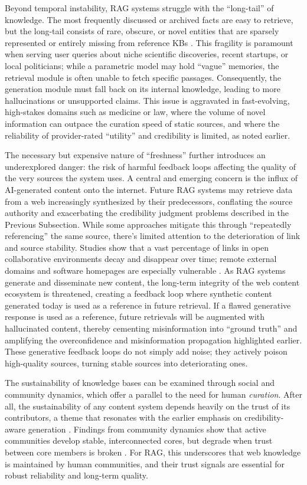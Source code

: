 \documentclass[11pt]{article}
\begin{document}
Beyond temporal instability, RAG systems struggle with the ``long-tail'' of knowledge. The most frequently discussed or archived facts are easy to retrieve, but the long-tail consists of rare, obscure, or novel entities that are sparsely represented or entirely missing from reference KBs \cite{ref244}. This fragility is paramount when serving user queries about niche scientific discoveries, recent startups, or local politicians; while a parametric model may hold ``vague'' memories, the retrieval module is often unable to fetch specific passages. Consequently, the generation module must fall back on its internal knowledge, leading to more hallucinations or unsupported claims. This issue is aggravated in fast-evolving, high-stakes domains such as medicine or law, where the volume of novel information can outpace the curation speed of static sources, and where the reliability of provider-rated ``utility'' and credibility is limited, as noted earlier.

The necessary but expensive nature of ``freshness'' further introduces an underexplored danger: the risk of harmful feedback loops affecting the quality of the very sources the system uses. A central and emerging concern is the influx of AI-generated content onto the internet. Future RAG systems may retrieve data from a web increasingly synthesized by their predecessors, conflating the source authority and exacerbating the credibility judgment problems described in the Previous Subsection. While some approaches mitigate this through ``repeatedly referencing'' the same source, there's limited attention to the deterioration of link and source stability. Studies show that a vast percentage of links in open collaborative environments decay and disappear over time; remote external domains and software homepages are especially vulnerable \cite{ref245}. As RAG systems generate and disseminate new content, the long-term integrity of the web content ecosystem is threatened, creating a feedback loop where synthetic content generated today is used as a reference in future retrieval. If a flawed generative response is used as a reference, future retrievals will be augmented with hallucinated content, thereby cementing misinformation into ``ground truth'' and amplifying the overconfidence and misinformation propagation highlighted earlier. These generative feedback loops do not simply add noise; they actively poison high-quality sources, turning stable sources into deteriorating ones.

The sustainability of knowledge bases can be examined through social and community dynamics, which offer a parallel to the need for human \emph{curation}. After all, the sustainability of any content system depends heavily on the trust of its contributors, a theme that resonates with the earlier emphasis on credibility-aware generation \cite{ref239}. Findings from community dynamics show that active communities develop stable, interconnected cores, but degrade when trust between core members is broken \cite{ref246}. For RAG, this underscores that web knowledge is maintained by human communities, and their trust signals are essential for robust reliability and long-term quality.
\end{document}
